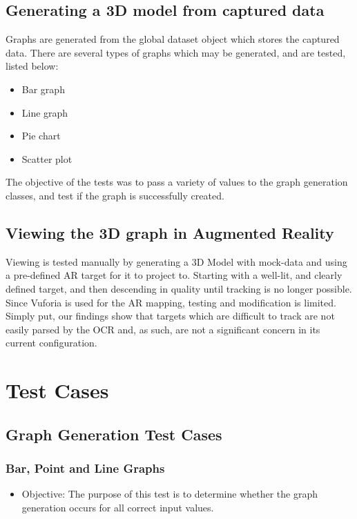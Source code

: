 \documentclass[a4paper,12pt]{article}
\begin{document}
\subsection{Generating a 3D model from captured data}
Graphs are generated from the global dataset object which stores the captured data. There are several types of graphs which may be generated, and are tested, listed below:
\begin{itemize}
	\item Bar graph
	\item Line graph
	\item Pie chart
	\item Scatter plot
\end{itemize}

The objective of the tests was to pass a variety of values to the graph generation classes, and test if the graph is successfully created.\\

\subsection{Viewing the 3D graph in Augmented Reality}
Viewing is tested manually by generating a 3D Model with mock-data and using a pre-defined AR target for it to project to. Starting with a well-lit, and clearly defined target, and then descending in quality until tracking is no longer possible. Since Vuforia is used for the AR mapping, testing and modification is limited. Simply put, our findings show that targets which are difficult to track are not easily parsed by the OCR and, as such, are not a significant concern in its current configuration.

\section{Test Cases}
\subsection{Graph Generation Test Cases}
\subsubsection{Bar, Point and Line Graphs}
\begin{itemize}
	\item Objective: The purpose of this test is to determine whether the graph generation occurs for all correct input values.
\end{itemize}
\end{document}
